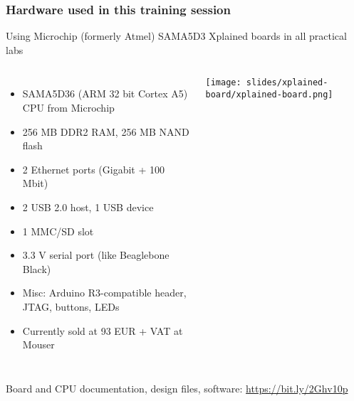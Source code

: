 \begin{frame}
\frametitle{Hardware used in this training session}
  Using Microchip (formerly Atmel) SAMA5D3 Xplained boards in all practical labs
  \begin{columns}
    {\footnotesize
    \begin{itemize}
	\item SAMA5D36 (ARM 32 bit Cortex A5) CPU from Microchip
	\item 256 MB DDR2 RAM, 256 MB NAND flash
	\item 2 Ethernet ports (Gigabit + 100 Mbit)
	\item 2 USB 2.0 host, 1 USB device
	\item 1 MMC/SD slot
	\item 3.3 V serial port (like Beaglebone Black)
	\item Misc: Arduino R3-compatible header, JTAG, buttons, LEDs
	\item Currently sold at 93 EUR + VAT at Mouser
    \end{itemize}
    }
    \texttt{[image: slides/xplained-board/xplained-board.png]}
  \end{columns}
  \vspace{1em}
  {\small
  Board and CPU documentation, design files, software:
  \url{https://bit.ly/2Ghv10p}
  }
\end{frame}
